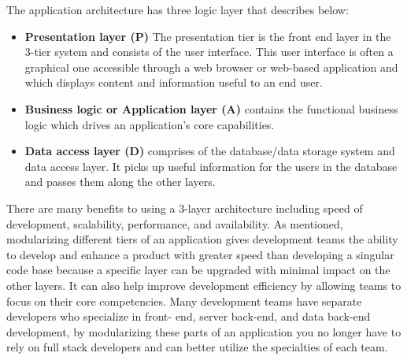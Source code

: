 The application architecture has three logic layer that describes below:
\begin{itemize}
    \item \textbf{Presentation layer (P)} The presentation tier is the front end layer in the 3-tier system and consists of the user interface. This user interface is often a graphical one accessible through a web browser or web-based application and which displays content and information useful to an end user.\\
    
    \item \textbf{Business logic or Application layer (A)} contains the functional business logic which drives an application’s core capabilities. \\
    
    \item \textbf{Data access layer (D)} comprises of the database/data storage system and data access layer. It picks up useful information for the users in the database and passes them along the other layers.\\
\end{itemize}

There are many benefits to using a 3-layer architecture including speed of development, scalability, performance, and availability.  As mentioned, modularizing different tiers of an application gives development teams the ability to develop and enhance a product with greater speed than developing a singular code base because a specific layer can be upgraded with minimal impact on the other layers.  It can also help improve development efficiency by allowing teams to focus on their core competencies. Many development teams have separate developers who specialize in front- end, server back-end, and data back-end development, by modularizing these parts of an application you no longer have to rely on full stack developers and can better utilize the specialties of each team.